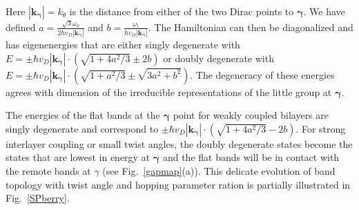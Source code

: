 \documentclass[aps,prl,reprint,amssymb,groupedaddress,twocolumn]{revtex4}
\begin{document}
Here $|\bm{k}_{\bm{\gamma}}|=k_{\theta}$ is the distance from either of the two Dirac points to $\bm{\gamma}$.
We have defined $a=\frac{\sqrt{3}\omega_0}{2\hbar v_D |\bm{k}_{\bm{\gamma}}|}$ and $b=\frac{\omega_1}{\hbar v_D |\bm{k}_{\bm{\gamma}}|}$. 
The Hamiltonian can then be diagonalized and has eigenenergies that are 
either singly degenerate with $E=\pm\hbar v_D |\bm{k}_{\bm{\gamma}}|\cdot (\sqrt{1+4a^2/3}\pm2b)$
or doubly degenerate with
$E=\pm\hbar v_D |\bm{k}_{\bm{\gamma}}|\cdot (\sqrt{1+a^2/3}\pm\sqrt{3a^2+b^2})$.
The degeneracy of these energies agrees with dimension of the irreducible representations of the little group at 
$\bm{\gamma}$.

The energies of the flat bands at the $\bm{\gamma}$ point for weakly coupled bilayers are singly degenerate and correspond to 
$\pm\hbar v_D |\bm{k}_{\bm{\gamma}}|\cdot (\sqrt{1+4a^2/3}-2b)$.
For strong interlayer coupling or small twist angles,
the doubly degenerate states become the states that are lowest in energy at $\bm{\gamma}$
and the flat bands will be in contact with the remote bands at $\gamma$ (see Fig.~\ref{gapmap}(a)).  
This delicate evolution of band topology with twist angle and hopping parameter ration 
is partially illustrated in Fig.~\ref{SPberry}.
\end{document}
